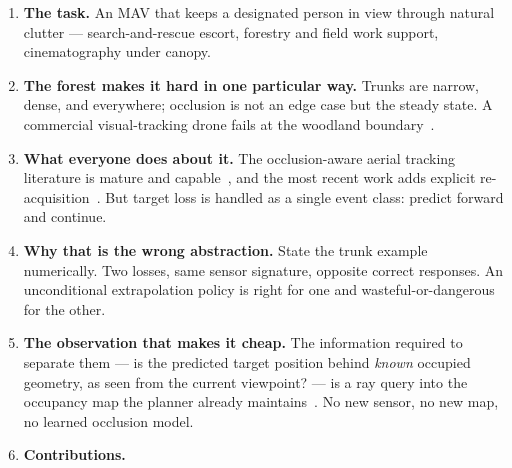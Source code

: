 \documentclass[conference]{IEEEtran}
\begin{document}
\begin{enumerate}
  \item \textbf{The task.} An MAV that keeps a designated person in view through
        natural clutter --- search-and-rescue escort, forestry and field work
        support, cinematography under canopy.
  \item \textbf{The forest makes it hard in one particular way.} Trunks are
        narrow, dense, and everywhere; occlusion is not an edge case but the
        steady state. A commercial visual-tracking drone fails at the woodland
        boundary~\cite{ren2025super}.
  \item \textbf{What everyone does about it.} The occlusion-aware aerial
        tracking literature is mature and
        capable~\cite{ji2022elastic,wang2021visibility,svpto2023,gao2024adaptive},
        and the most recent work adds explicit
        re-acquisition~\cite{lin2026evatracker}. But target loss is handled as a
        single event class: predict forward and continue.
  \item \textbf{Why that is the wrong abstraction.} State the trunk example
        numerically. Two losses, same sensor signature, opposite correct
        responses. An unconditional extrapolation policy is right for one and
        wasteful-or-dangerous for the other.
  \item \textbf{The observation that makes it cheap.} The information required
        to separate them --- is the predicted target position behind
        \emph{known} occupied geometry, as seen from the current viewpoint? ---
        is a ray query into the occupancy map the planner already
        maintains~\cite{ren2023rogmap}. No new sensor, no new map, no learned
        occlusion model.
  \item \textbf{Contributions.}
\end{enumerate}
\end{document}
